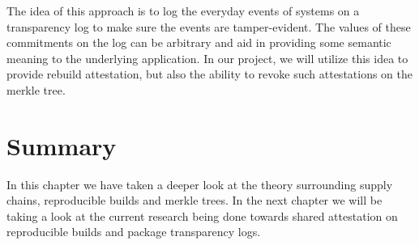 \documentclass[../Main/thesis.tex]{subfiles}
\begin{document}
The idea of this approach is to log the everyday events of systems on a
transparency log to make sure the events are tamper-evident. The values of these
commitments on the log can be arbitrary and aid in providing some semantic
meaning to the underlying application. In our project, we will utilize this idea
to provide rebuild attestation, but also the ability to revoke such attestations
on the merkle tree.

\section*{Summary}\label{sec:summary-theory} 
In this chapter we have taken a deeper look at the theory surrounding supply
chains, reproducible builds and merkle trees. In the next chapter we will be
taking a look at the current research being done towards shared attestation on
reproducible builds and package transparency logs.
\blankpage
\end{document}
